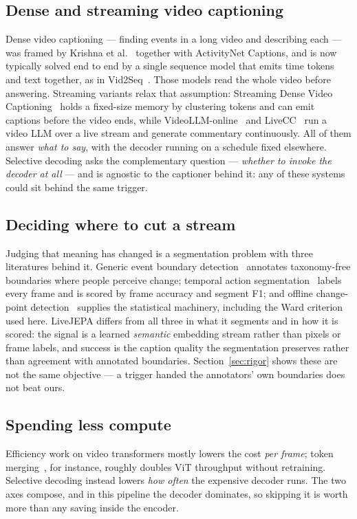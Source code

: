 \documentclass[journal]{IEEEtran}
\begin{document}
\subsection{Dense and streaming video captioning}
Dense video captioning --- finding events in a long video and describing each ---
was framed by Krishna et al.~\cite{densecap2017} together with ActivityNet
Captions, and is now typically solved end to end by a single sequence model that
emits time tokens and text together, as in Vid2Seq~\cite{vid2seq2023}. Those
models read the whole video before answering. Streaming variants relax that
assumption: Streaming Dense Video Captioning~\cite{streamingdvc2024} holds a
fixed-size memory by clustering tokens and can emit captions before the video
ends, while VideoLLM-online~\cite{videollmonline2024} and
LiveCC~\cite{livecc2025} run a video LLM over a live stream and generate
commentary continuously. All of them answer \emph{what to say}, with the decoder
running on a schedule fixed elsewhere. Selective decoding asks the complementary
question --- \emph{whether to invoke the decoder at all} --- and is agnostic to
the captioner behind it: any of these systems could sit behind the same trigger.

\subsection{Deciding where to cut a stream}
Judging that meaning has changed is a segmentation problem with three literatures
behind it. Generic event boundary detection~\cite{gebd2021} annotates
taxonomy-free boundaries where people perceive change; temporal action
segmentation~\cite{tas2023} labels every frame and is scored by frame accuracy and
segment F1; and offline change-point detection~\cite{changepoint2020} supplies the
statistical machinery, including the Ward criterion~\cite{ward1963} used here.
LiveJEPA differs from all three in what it segments and in how it is scored: the
signal is a learned \emph{semantic} embedding stream rather than pixels or frame
labels, and success is the caption quality the segmentation preserves rather than
agreement with annotated boundaries. Section~\ref{sec:rigor} shows these are not
the same objective --- a trigger handed the annotators' own boundaries does not
beat ours.

\subsection{Spending less compute}
Efficiency work on video transformers mostly lowers the cost \emph{per frame};
token merging~\cite{tome2023}, for instance, roughly doubles ViT throughput
without retraining. Selective decoding instead lowers \emph{how often} the
expensive decoder runs. The two axes compose, and in this pipeline the decoder
dominates, so skipping it is worth more than any saving inside the encoder.
\end{document}
